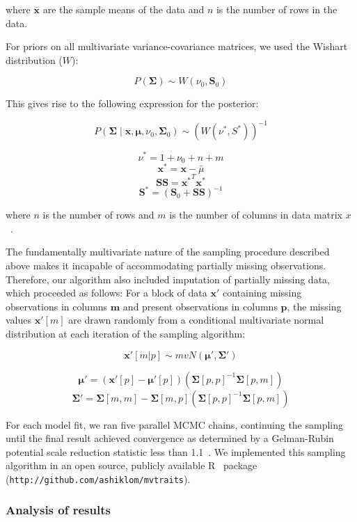 where ${\bar{{\mathbf{x}}}}$ are the sample means of the data and $n$ is the number of rows in the data.

For priors on all multivariate variance-covariance matrices, we used the Wishart distribution ($W$):

\[P(\mathbf{\Sigma}) \sim W(\nu_0, \mathbf{S}_0)\]

This gives rise to the following expression for the posterior:

\[P(\mathbf{\Sigma} \mid
  \mathbf{x}, \mathbf{\mu},
  \nu_0, \mathbf{\Sigma}_0)
  \sim
  {(W(\nu^*, S^*))}^{-1}\]

\[\nu^* = 1 + \nu_0 + n + m\]
\[\mathbf{x^*} = \mathbf{x} - \bar{\mu}\]
\[\mathbf{SS} = \mathbf{x^*}^{T} \mathbf{x^*}\]
\[\mathbf{S^*} = {(\mathbf{S}_0 + \mathbf{SS})}^{-1}\]

where $n$ is the number of rows and $m$ is the number of columns in data matrix $x$~\cite[full derivation in][]{gelman_bayesian}.

The fundamentally multivariate nature of the sampling procedure described above makes it incapable of accommodating partially missing observations.
Therefore, our algorithm also included imputation of partially missing data, which proceeded as follows:
For a block of data $\mathbf{x'}$ containing missing observations in columns $\mathbf{m}$ and present observations in columns $\mathbf{p}$,
the missing values $\mathbf{x'}[m]$ are drawn randomly from a conditional multivariate normal distribution at each iteration of the sampling algorithm:

\[\mathbf{x'}[m|p] \sim mvN(\mathbf{\mu}', \mathbf{\Sigma}')\]

\[\mathbf{\mu'} = 
  (\mathbf{x'}[p] - \mathbf{\mu'}[p]) 
  ({\mathbf{\Sigma}[p,p]}^{-1} \mathbf{\Sigma}[p,m])\]
\[\mathbf{\Sigma'} = \mathbf{\Sigma}[m,m] - 
  \mathbf{\Sigma}[m,p]
  ({\mathbf{\Sigma}[p,p]}^{-1} \mathbf{\Sigma}[p,m])\]

For each model fit, we ran five parallel MCMC chains, continuing the sampling until the final result achieved convergence as determined by a Gelman-Rubin potential scale reduction statistic less than 1.1~\cite{gelman_1992_inference}.
We implemented this sampling algorithm in an open source, publicly available R~\cite[version 3.4.3,][]{rstats} package (\texttt{http://github.com/ashiklom/mvtraits}).


\subsubsection{Analysis of results}

